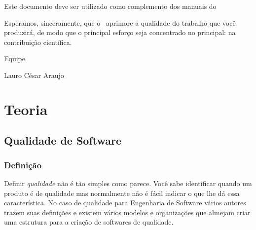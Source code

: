 \documentclass[
	12pt,				%
	openright,			%
	twoside,			%
	a4paper,			%
	english,			%
	brazil,				%
	]{abntex2}
\begin{document}
Este documento deve ser utilizado como complemento dos manuais do \abnTeX\ 

Esperamos, sinceramente, que o \abnTeX\ aprimore a qualidade do trabalho que
você produzirá, de modo que o principal esforço seja concentrado no principal:
na contribuição científica.

Equipe \abnTeX 

Lauro César Araujo


\part{Teoria}

\chapter{Qualidade de Software}

\section{Definição}

Definir \emph{qualidade} não é tão simples como parece. Você sabe identificar quando um produto é de qualidade mas normalmente não é fácil indicar o que lhe dá essa característica. No caso de qualidade para Engenharia de Software vários autores trazem suas definições e existem vários modelos e organizações que almejam criar uma estrutura para a criação de softwares de qualidade.
\end{document}
